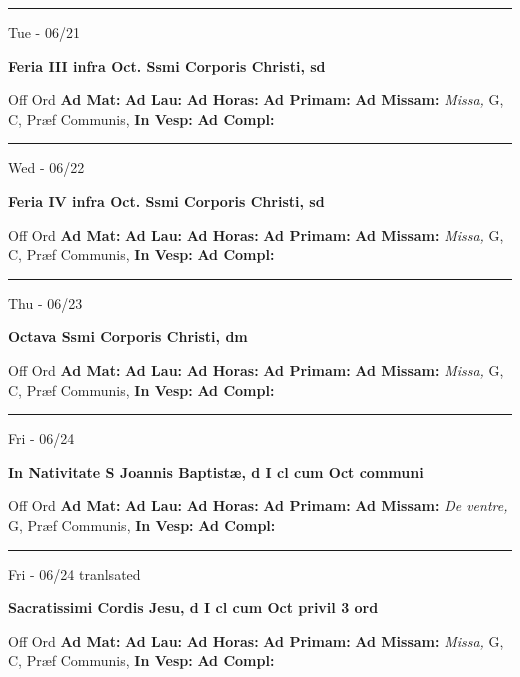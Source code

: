 \documentclass[letterpaper, 10pt]{article}
\begin{document}
\hrule
\begin{center}
Tue - 06/21
\end{center}\textbf{ \large Feria III infra Oct. Ssmi Corporis Christi, \textnormal{\normalsize sd}}
\begin{justify}
Off Ord
\textbf{Ad Mat: }
\textbf{Ad Lau: }
\textbf{Ad Horas: }
\textbf{Ad Primam: }
\textbf{Ad Missam:} \textit{Missa, } G, C, Præf Communis, 
\textbf{In Vesp: }
\textbf{Ad Compl: }\end{justify}



\hrule
\begin{center}
Wed - 06/22
\end{center}\textbf{ \large Feria IV infra Oct. Ssmi Corporis Christi, \textnormal{\normalsize sd}}
\begin{justify}
Off Ord
\textbf{Ad Mat: }
\textbf{Ad Lau: }
\textbf{Ad Horas: }
\textbf{Ad Primam: }
\textbf{Ad Missam:} \textit{Missa, } G, C, Præf Communis, 
\textbf{In Vesp: }
\textbf{Ad Compl: }\end{justify}



\hrule
\begin{center}
Thu - 06/23
\end{center}\textbf{ \large Octava Ssmi Corporis Christi, \textnormal{\normalsize dm}}
\begin{justify}
Off Ord
\textbf{Ad Mat: }
\textbf{Ad Lau: }
\textbf{Ad Horas: }
\textbf{Ad Primam: }
\textbf{Ad Missam:} \textit{Missa, } G, C, Præf Communis, 
\textbf{In Vesp: }
\textbf{Ad Compl: }\end{justify}



\hrule
\begin{center}
Fri - 06/24
\end{center}\textbf{ \large In Nativitate S Joannis Baptistæ, \textnormal{\normalsize d I cl cum Oct communi}}
\begin{justify}
Off Ord
\textbf{Ad Mat: }
\textbf{Ad Lau: }
\textbf{Ad Horas: }
\textbf{Ad Primam: }
\textbf{Ad Missam:} \textit{De ventre, } G, Præf Communis, 
\textbf{In Vesp: }
\textbf{Ad Compl: }\end{justify}



\hrule
\begin{center}
Fri - 06/24 tranlsated
\end{center}\textbf{ \large Sacratissimi Cordis Jesu, \textnormal{\normalsize d I cl cum Oct privil 3 ord}}
\begin{justify}
Off Ord
\textbf{Ad Mat: }
\textbf{Ad Lau: }
\textbf{Ad Horas: }
\textbf{Ad Primam: }
\textbf{Ad Missam:} \textit{Missa, } G, C, Præf Communis, 
\textbf{In Vesp: }
\textbf{Ad Compl: }\end{justify}
\end{document}
